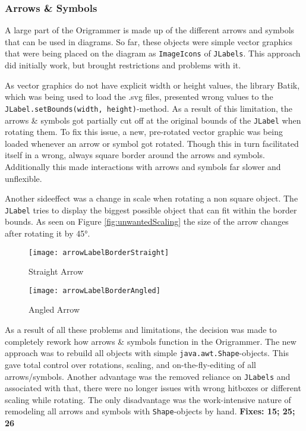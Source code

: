 \subsubsection{Arrows \& Symbols}
A large part of the Origrammer is made up of the different arrows and symbols that can be used in diagrams. So far, these objects were simple vector graphics that were being placed on the diagram as \texttt{ImageIcons} of \texttt{JLabels}. This approach did initially work, but brought restrictions and problems with it.

 As vector graphics do not have explicit width or height values, the library Batik\cite{batik}, which was being used to load the .svg files, presented wrong values to the \texttt{JLabel.setBounds(width, height)}-method. As a result of this limitation, the arrows \& symbols got partially cut off at the original bounds of the \texttt{JLabel} when rotating them. To fix this issue, a new, pre-rotated vector graphic was being loaded whenever an arrow or symbol got rotated. Though this in turn facilitated itself in a wrong, always square border around the arrows and symbols. Additionally this made interactions with arrows and symbols far slower and unflexible.
 
 Another sideeffect was a change in scale when rotating a non square object. The \texttt{JLabel} tries to display the biggest possible object that can fit within the border bounds. As seen on Figure \ref{fig:unwantedScaling} the size of the arrow changes after rotating it by 45°.

\begin{figure*}[htbp]
	\centering
	\begin{subfigure}{0.3\textwidth}
		\texttt{[image: arrowLabelBorderStraight]}
		\caption{Straight Arrow}
		\label{fig:arrowLabelBorderStraight}
	\end{subfigure}
	\begin{subfigure}{0.3\textwidth}
		\texttt{[image: arrowLabelBorderAngled]}
		\caption{Angled Arrow}
		\label{fig:arrowLabelBorderAngled}
	\end{subfigure}
	\caption{Unwanted Scaling when Rotating}
	\label{fig:unwantedScaling}
\end{figure*}

As a result of all these problems and limitations, the decision was made to completely rework how arrows \& symbols function in the Origrammer. The new approach was to rebuild all objects with simple \texttt{java.awt.Shape}-objects. This gave total control over rotations, scaling, and on-the-fly-editing of all arrows/symbols. Another advantage was the removed reliance on \texttt{JLabels} and associated with that, there were no longer issues with wrong hitboxes or different scaling while rotating. The only disadvantage was the work-intensive nature of remodeling all arrows and symbols with \texttt{Shape}-objects by hand.
\newline
\textbf{Fixes: 15; 25; 26}
